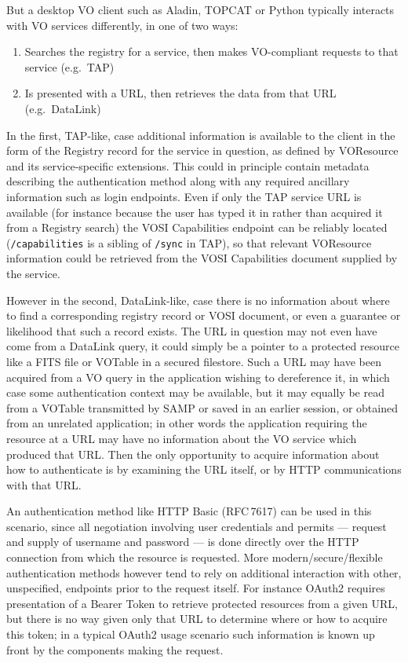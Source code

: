 \documentclass[11pt,a4paper]{ivoa}
\newcommand{\rfc}[1]{RFC\,#1}
\begin{document}
But a desktop VO client such as Aladin, TOPCAT or Python
typically interacts with VO services differently, in one of two
ways:
\begin{enumerate}
\item Searches the registry for a service, then makes VO-compliant
      requests to that service (e.g.\ TAP)
\item Is presented with a URL, then retrieves the data from that URL
      (e.g.\ DataLink)
\end{enumerate}
In the first, TAP-like, case additional information is available to the
client in the form of the Registry record for the service in question,
as defined by VOResource \citep{2008ivoa.spec.0222P}
and its service-specific extensions.
This could in principle contain metadata describing the authentication
method along with any required ancillary information such as
login endpoints.
Even if only the TAP service URL is available
(for instance because the user has typed it in rather than acquired it
from a Registry search) the VOSI Capabilities endpoint can be reliably
located ({\tt /capabilities} is a sibling of {\tt /sync} in TAP),
so that relevant VOResource information could be retrieved from the VOSI
Capabilities document supplied by the service.

However in the second, DataLink-like, case
there is no information about where to find a corresponding
registry record or VOSI document,
or even a guarantee or likelihood that such a record exists.
The URL in question may not even have come from a DataLink query,
it could simply be a pointer to a protected resource like a
FITS file or VOTable in a secured filestore.
Such a URL may have been acquired from a VO query in the application
wishing to dereference it, in which case some authentication context
may be available,
but it may equally be read from a VOTable transmitted by SAMP
or saved in an earlier session, or obtained from an unrelated application;
in other words the application requiring the resource at a URL may
have no information about the VO service which produced that URL.
Then the only opportunity to acquire information about how to authenticate
is by examining the URL itself, or by HTTP communications with that URL.

An authentication method like HTTP Basic (\rfc{7617})
can be used in this scenario,
since all negotiation involving user credentials and permits ---
request and supply of username and password ---
is done directly
over the HTTP connection from which the resource is requested.
More modern/secure/flexible authentication methods however tend to
rely on additional interaction with other, unspecified, endpoints
prior to the request itself.  For instance OAuth2 requires presentation
of a Bearer Token to retrieve protected resources from a given URL,
but there is no way given only that URL to determine where or how
to acquire this token;
in a typical OAuth2 usage scenario such information is known up front
by the components making the request.
\end{document}
